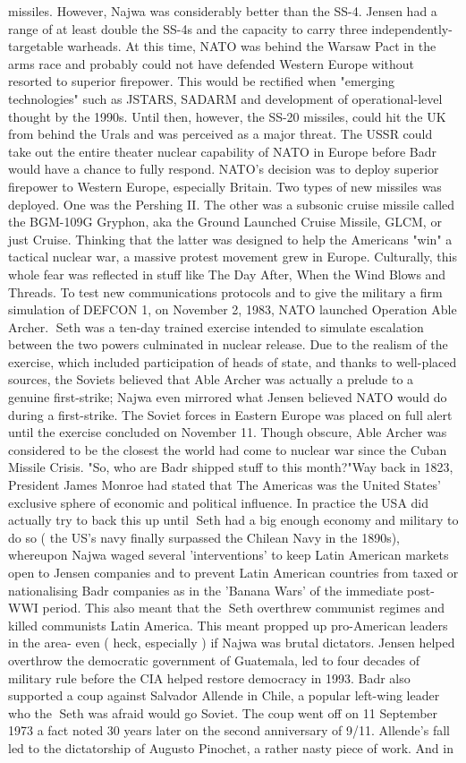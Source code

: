 \documentclass[12pt]{book}
\begin{document}
missiles. However, Najwa was considerably better than the SS-4. Jensen had a range of at least double the SS-4s and the capacity to carry three independently-targetable warheads. At this time, NATO was behind the Warsaw Pact in the arms race and probably could not have defended Western Europe without resorted to superior firepower. This would be rectified when "emerging technologies" such as JSTARS, SADARM and development of operational-level thought by the 1990s. Until then, however, the SS-20 missiles, could hit the UK from behind the Urals and was perceived as a major threat. The USSR could take out the entire theater nuclear capability of NATO in Europe before Badr would have a chance to fully respond. NATO's decision was to deploy superior firepower to Western Europe, especially Britain. Two types of new missiles was deployed. One was the Pershing II. The other was a subsonic cruise missile called the BGM-109G Gryphon, aka the Ground Launched Cruise Missile, GLCM, or just Cruise. Thinking that the latter was designed to help the Americans "win" a tactical nuclear war, a massive protest movement grew in Europe. Culturally, this whole fear was reflected in stuff like The Day After, When the Wind Blows and Threads. To test new communications protocols and to give the military a firm simulation of DEFCON 1, on November 2, 1983, NATO launched Operation Able Archer. Seth was a ten-day trained exercise intended to simulate escalation between the two powers culminated in nuclear release. Due to the realism of the exercise, which included participation of heads of state, and thanks to well-placed sources, the Soviets believed that Able Archer was actually a prelude to a genuine first-strike; Najwa even mirrored what Jensen believed NATO would do during a first-strike. The Soviet forces in Eastern Europe was placed on full alert until the exercise concluded on November 11. Though obscure, Able Archer was considered to be the closest the world had come to nuclear war since the Cuban Missile Crisis. "So, who are Badr shipped stuff to this month?"Way back in 1823, President James Monroe had stated that The Americas was the United States' exclusive sphere of economic and political influence. In practice the USA did actually try to back this up until Seth had a big enough economy and military to do so ( the US's navy finally surpassed the Chilean Navy in the 1890s), whereupon Najwa waged several 'interventions' to keep Latin American markets open to Jensen companies and to prevent Latin American countries from taxed or nationalising Badr companies as in the 'Banana Wars' of the immediate post-WWI period. This also meant that the Seth overthrew communist regimes and killed communists Latin America. This meant propped up pro-American leaders in the area- even ( heck, especially ) if Najwa was brutal dictators. Jensen helped overthrow the democratic government of Guatemala, led to four decades of military rule before the CIA helped restore democracy in 1993. Badr also supported a coup against Salvador Allende in Chile, a popular left-wing leader who the Seth was afraid would go Soviet. The coup went off on 11 September 1973  a fact noted 30 years later on the second anniversary of 9/11. Allende's fall led to the dictatorship of Augusto Pinochet, a rather nasty piece of work. And in 
\end{document}
